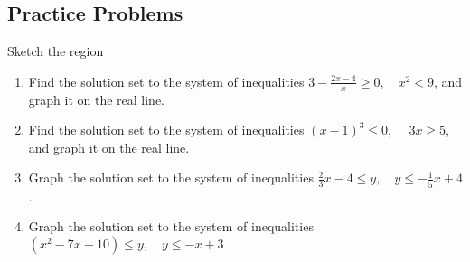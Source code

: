 \documentclass[11pt]{book}               %
\begin{document}
\subsection{Practice Problems}
Sketch the region
\begin{enumerate}
\item Find the solution set to the system of inequalities
$3 - \frac{2x - 4}{x} \geq 0,\quad x^2 < 9$,
and graph it on the real line.

\item Find the solution set to the system of inequalities
$(x - 1)^3 \leq 0, \ \quad 3x \geq 5$,
and graph it on the real line.

\item  Graph the solution set to the system of inequalities
$\frac{2}{3}x - 4 \leq y, \quad y \leq -\frac{1}{5}x + 4$.
\item Graph the solution set to the system of inequalities
$(x^2 - 7x +10) \leq y, \quad y \leq -x+3$
\end{enumerate}
\end{document}
